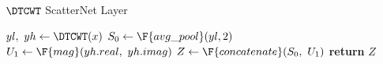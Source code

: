 \begin{algorithm}[tb]
\caption{$\DTCWT$ ScatterNet Layer}\label{alg:ch3:dtcwt_scat}
\begin{algorithmic}[1]
  \State $yl,\ yh \gets \DTCWT(x)$
  \State $S_0 \gets \F{avg\_pool}(yl, 2)$ 
  \State $U_1 \gets \F{mag}(yh.real,\ yh.imag)$ 
  \State $Z \gets \F{concatenate}(S_0,\ U_1)$ 
  \State \textbf{return} $Z$
\EndFunction
\end{algorithmic}
\end{algorithm}
